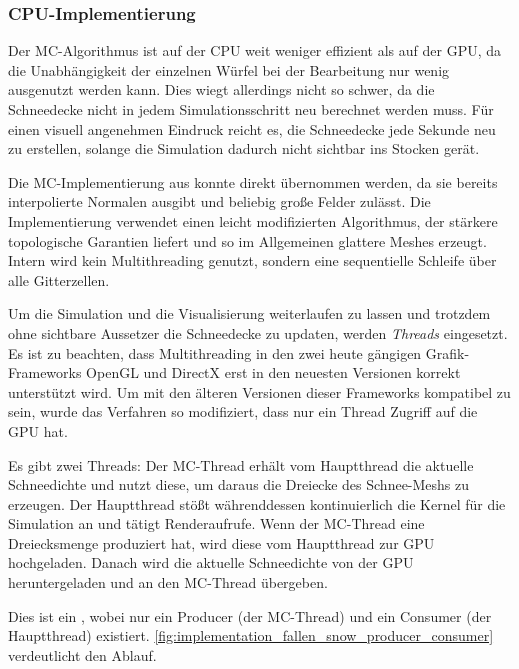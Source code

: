 \subsubsection{CPU-Implementierung}

Der MC-Algorithmus ist auf der CPU weit weniger effizient als auf der
GPU, da die Unabhängigkeit der einzelnen Würfel bei der Bearbeitung
nur wenig ausgenutzt werden kann. Dies wiegt allerdings nicht so
schwer, da die Schneedecke nicht in jedem Simulationsschritt neu
berechnet werden muss. Für einen visuell angenehmen Eindruck reicht
es, die Schneedecke jede Sekunde neu zu erstellen, solange die
Simulation dadurch nicht sichtbar ins Stocken gerät.

Die MC-Implementierung aus \cite{marching_cubes_jgt} konnte direkt
übernommen werden, da sie bereits interpolierte Normalen ausgibt und
beliebig große Felder zulässt. Die Implementierung verwendet einen
leicht modifizierten Algorithmus, der stärkere topologische Garantien
liefert und so im Allgemeinen glattere Meshes erzeugt. Intern wird
kein Multithreading genutzt, sondern eine sequentielle Schleife über
alle Gitterzellen.

Um die Simulation und die Visualisierung weiterlaufen zu lassen und
trotzdem ohne sichtbare Aussetzer die Schneedecke zu updaten, werden
\emph{Threads} eingesetzt. Es ist zu beachten, dass Multithreading in
den zwei heute gängigen Grafik-Frameworks OpenGL und DirectX erst in
den neuesten Versionen korrekt unterstützt wird. Um mit den älteren
Versionen dieser Frameworks kompatibel zu sein, wurde das Verfahren so
modifiziert, dass nur ein Thread Zugriff auf die GPU hat.

Es gibt zwei Threads: Der MC-Thread erhält vom Hauptthread die
aktuelle Schneedichte und nutzt diese, um daraus die Dreiecke des
Schnee-Meshs zu erzeugen. Der Hauptthread stößt währenddessen
kontinuierlich die Kernel für die Simulation an und tätigt
Renderaufrufe. Wenn der MC-Thread eine Dreiecksmenge produziert hat,
wird diese vom Hauptthread zur GPU hochgeladen. Danach wird die
aktuelle Schneedichte von der GPU heruntergeladen und an den MC-Thread
übergeben.

Dies ist ein , wobei nur ein
Producer (der MC-Thread) und ein Consumer (der Hauptthread)
existiert. \cref{fig:implementation_fallen_snow_producer_consumer} verdeutlicht den Ablauf.

